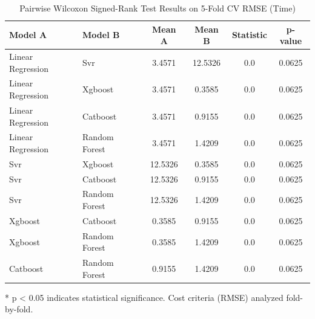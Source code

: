 \begin{table}[htbp]
\centering
\caption{Pairwise Wilcoxon Signed-Rank Test Results on 5-Fold CV RMSE (Time)}
\label{tab:wilcoxon_time}
\begin{tabular}{llcccc}
\toprule
\textbf{Model A} & \textbf{Model B} & \textbf{Mean A} & \textbf{Mean B} & \textbf{Statistic} & \textbf{p-value} \\
\midrule
Linear Regression & Svr & 3.4571 & 12.5326 & 0.0 & 0.0625 \\
Linear Regression & Xgboost & 3.4571 & 0.3585 & 0.0 & 0.0625 \\
Linear Regression & Catboost & 3.4571 & 0.9155 & 0.0 & 0.0625 \\
Linear Regression & Random Forest & 3.4571 & 1.4209 & 0.0 & 0.0625 \\
Svr & Xgboost & 12.5326 & 0.3585 & 0.0 & 0.0625 \\
Svr & Catboost & 12.5326 & 0.9155 & 0.0 & 0.0625 \\
Svr & Random Forest & 12.5326 & 1.4209 & 0.0 & 0.0625 \\
Xgboost & Catboost & 0.3585 & 0.9155 & 0.0 & 0.0625 \\
Xgboost & Random Forest & 0.3585 & 1.4209 & 0.0 & 0.0625 \\
Catboost & Random Forest & 0.9155 & 1.4209 & 0.0 & 0.0625 \\
\bottomrule
\end{tabular}
\footnotesize{* p < 0.05 indicates statistical significance. Cost criteria (RMSE) analyzed fold-by-fold.}
\end{table}